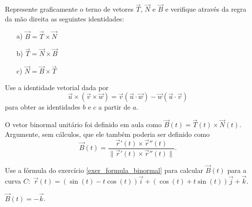 \begin{exer} Represente graficamente o terno de vetores $\vec{T}$, $\vec{N}$ e $\vec{B}$ e verifique através da regra da mão direita as seguintes identidades:
\begin{itemize}
\item[a)]$\vec{B}=\vec{T}\times\vec{N}$
\item[b)]$\vec{T}=\vec{N}\times\vec{B}$
\item[c)]$\vec{N}=\vec{B}\times\vec{T}$
\end{itemize}
Use a identidade vetorial dada por
$$\vec{u}\times\left(\vec{v}\times\vec{w}\right)=\vec{v}\left(\vec{u}\cdot\vec{w}\right)-\vec{w}\left(\vec{u}\cdot\vec{v}\right)$$ para obter as identidades $b$ e $c$ a partir de $a$.
\end{exer}
\begin{exer}\label{exer_formula_binormal}
 O vetor binormal unitário foi definido em aula como $\vec{B}(t)=\vec{T}(t)\times\vec{N}(t)$. Argumente, sem cálculos, que ele também poderia ser definido como 
 $$
 \vec{B}(t)=\frac{\vec{r}'(t)\times \vec{r}''(t)}{\|\vec{r}'(t)\times \vec{r}''(t)\|}.
 $$
\end{exer}
\begin{exer}
 Use a fórmula do exercício \ref{exer_formula_binormal} para calcular $\vec{B}(t)$ para a curva $C:$ $\vec{r}(t)=(\sin(t)-t\cos(t))\vec{i}+(\cos(t)+t\sin(t))\vec{j}+\vec{k}$.
\end{exer}
\begin{resp}
 $\vec{B}(t)=-\vec{k}$.
\end{resp}


